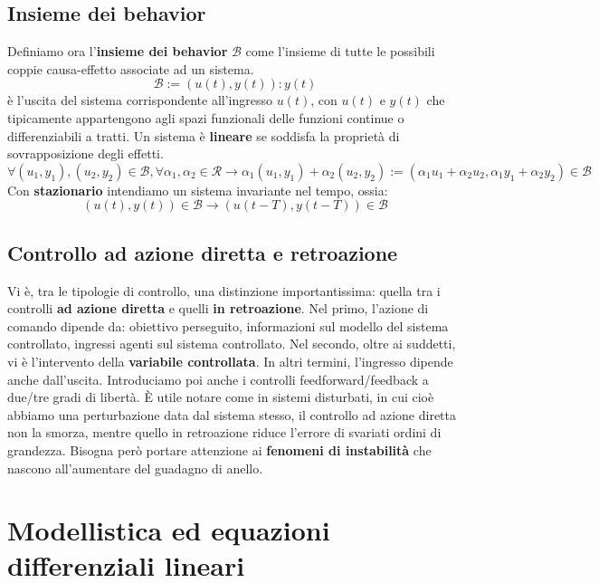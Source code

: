 \documentclass[11pt]{article}
\begin{document}
\subsection{Insieme dei behavior}
Definiamo ora l'\textbf{insieme dei behavior} $\mathcal{B}$ come l'insieme di tutte le possibili coppie causa-effetto associate ad un sistema.
\begin{displaymath}
    \mathcal{B}:={\left( u(t), y(t) \right) : y(t)}
\end{displaymath}
è l'uscita del sistema corrispondente all'ingresso $u(t)$, con $u(t)$ e $y(t)$ che tipicamente appartengono agli spazi funzionali delle funzioni continue o differenziabili a tratti.
Un sistema è \textbf{lineare} se soddisfa la proprietà di sovrapposizione degli effetti.
\begin{displaymath}
    \forall (u_1,y_1), (u_2, y_2) \in \mathcal{B}, \forall \alpha_1,\alpha_2 \in \mathcal{R} \rightarrow \alpha_1(u_1,y_1)+\alpha_2(u_2, y_2) := (\alpha_1 u_1+ \alpha_2 u_2, \alpha_1y_1 + \alpha_2 y_2) \in \mathcal{B}
\end{displaymath}
Con \textbf{stazionario} intendiamo un sistema invariante nel tempo, ossia:
\begin{displaymath}
    \left(u(t), y(t)\right) \in \mathcal{B} \rightarrow \left(u(t-T), y(t-T)\right) \in \mathcal{B}
\end{displaymath}
\subsection{Controllo ad azione diretta e retroazione}
Vi è, tra le tipologie di controllo, una distinzione importantissima: quella tra i controlli \textbf{ad azione diretta} e quelli \textbf{in retroazione}.
Nel primo, l'azione di comando dipende da: obiettivo perseguito, informazioni sul modello del sistema controllato, ingressi agenti sul sistema controllato. Nel secondo, oltre ai suddetti, vi è l'intervento della \textbf{variabile controllata}. In altri termini, l'ingresso dipende anche dall'uscita. Introduciamo poi anche i controlli feedforward/feedback a due/tre gradi di libertà.
È utile notare come in sistemi disturbati, in cui cioè abbiamo una perturbazione data dal sistema stesso, il controllo ad azione diretta non la smorza, mentre quello in retroazione riduce l'errore di svariati ordini di grandezza. Bisogna però portare attenzione ai \textbf{fenomeni di instabilità} che nascono all'aumentare del guadagno di anello.
\section{Modellistica ed equazioni differenziali lineari}
\end{document}
